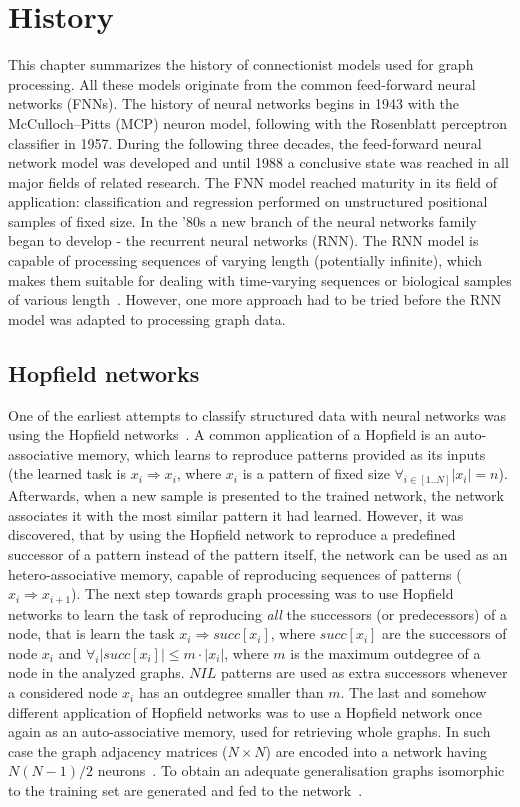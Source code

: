 
\chapter{History}
This chapter summarizes the history of connectionist models used for graph processing. All these models originate from the common feed-forward neural networks (FNNs). The history of neural networks begins in 1943 with the McCulloch–Pitts (MCP) neuron model, following with the Rosenblatt perceptron classifier in 1957. During the following three decades, the feed-forward neural network model was developed and until 1988 a conclusive state was reached in all major fields of related research. The FNN model reached maturity in its field of application: classification and regression performed on unstructured positional samples of fixed size. In the '80s a new branch of the neural networks family began to develop - the recurrent neural networks (RNN). The RNN model is capable of processing sequences of varying length (potentially infinite), which makes them suitable for dealing with time-varying sequences or biological samples of various length~\cite{saha2006prediction}. However, one more approach had to be tried before the RNN model was adapted to processing graph data.

\section{Hopfield networks}
One of the earliest attempts to classify structured data with neural networks was using the Hopfield networks~\cite{goulon2005hopfield}. A common application of a Hopfield is an auto-associative memory, which learns to reproduce patterns provided as its inputs (the learned task is $x_i \Rightarrow x_i$, where $x_i$ is a pattern of fixed size $\forall_{i \in [1..N]} |x_i| = n$). Afterwards, when a new sample is presented to the trained network, the network associates it with the most similar pattern it had learned. However, it was discovered, that by using the Hopfield network to reproduce a predefined successor of a pattern instead of the pattern itself, the network can be used as an hetero-associative memory, capable of reproducing sequences of patterns ($x_i \Rightarrow x_{i+1}$). The next step towards graph processing was to use Hopfield networks to learn the task of reproducing \emph{all} the successors (or predecessors) of a node, that is learn the task $x_i \Rightarrow succ[x_i]$, where $succ[x_i]$ are the successors of node $x_i$ and $\forall_i |succ[x_i]| \leq m \cdot |x_i|$, where $m$ is the maximum outdegree of a node in the analyzed graphs. $NIL$ patterns are used as extra successors whenever a considered node $x_i$ has an outdegree smaller than $m$. The last and somehow different application of Hopfield networks was to use a Hopfield network once again as an auto-associative memory, used for retrieving whole graphs. In such case the graph adjacency matrices ($N \times N$) are encoded into a network having $N(N - 1)/2$ neurons~\cite{goulon2005hopfield}. To obtain an adequate generalisation graphs isomorphic to the training set are generated and fed to the network~\cite{kree1988recognition}.

